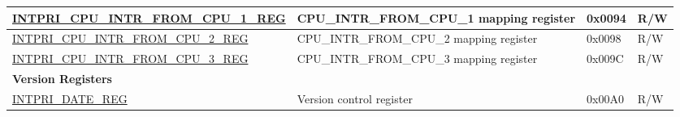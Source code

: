\begin{longtable}{ | p{10cm} | p{10cm} | p{1.3cm} | p{1cm} | }
\hyperref[regdesc:INTPRICPUINTRFROMCPUNREG]{INTPRI\_CPU\_INTR\_FROM\_CPU\_1\_REG} & CPU\_INTR\_FROM\_CPU\_1 mapping register & 0x0094 & R/W \\ \hline
\hyperref[regdesc:INTPRICPUINTRFROMCPUNREG]{INTPRI\_CPU\_INTR\_FROM\_CPU\_2\_REG} & CPU\_INTR\_FROM\_CPU\_2 mapping register & 0x0098 & R/W \\ \hline
\hyperref[regdesc:INTPRICPUINTRFROMCPUNREG]{INTPRI\_CPU\_INTR\_FROM\_CPU\_3\_REG} & CPU\_INTR\_FROM\_CPU\_3 mapping register & 0x009C & R/W \\ \hline
\multicolumn{4}{|l|}{\textbf{Version Registers}} \\ \hline
\hyperref[regdesc:INTPRIDATEREG]{INTPRI\_DATE\_REG} & Version control register & 0x00A0 & R/W \\ \hline
\end{longtable}
